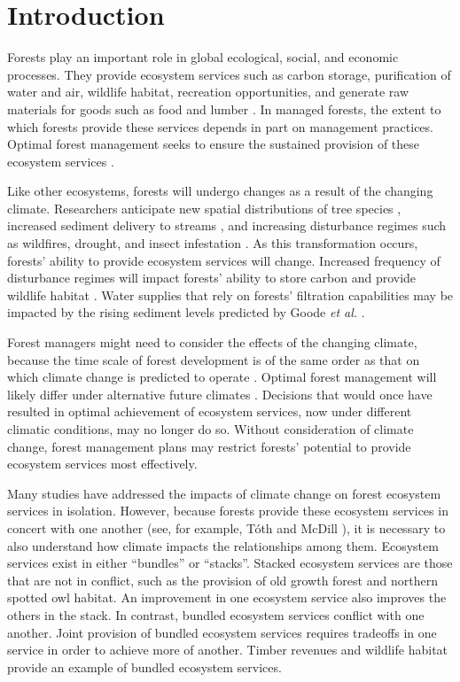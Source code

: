
\section{Introduction}
 
Forests play an important role in global ecological, social, and economic processes. They provide ecosystem services such as carbon storage, purification of water and air, wildlife habitat, recreation opportunities, and generate raw materials for goods such as food and lumber \cite{daily1997ecosystem}. In managed forests, the extent to which forests provide these services depends in part on management practices. Optimal forest management seeks to ensure the sustained provision of these ecosystem services \cite{cfrForestMgmt}.

Like other ecosystems, forests will undergo changes as a result of the changing climate. Researchers anticipate new spatial distributions of tree species \cite{iverson1998predicting}, increased sediment delivery to streams \cite{Goode20121}, and increasing disturbance regimes such as wildfires, drought, and insect infestation \cite{vose2012effects}. As this transformation occurs, forests' ability to provide ecosystem services will change. Increased frequency of disturbance regimes will impact forests' ability to store carbon \cite{bonan2008forests} and provide wildlife habitat \cite{mckenzie2004climatic}. Water supplies that rely on forests' filtration capabilities may be impacted by the rising sediment levels predicted by Goode \textit{et al.} \cite{Goode20121}.

Forest managers might need to consider the effects of the changing climate, because the time scale of forest development is of the same order as that on which climate change is predicted to operate \cite{ipcc2013climate}. Optimal forest management will likely differ under alternative future climates \cite{linder2000developing}. Decisions that would once have resulted in optimal achievement of ecosystem services, now under different climatic conditions, may no longer do so. Without consideration of climate change, forest management plans may restrict forests' potential to provide ecosystem services most effectively.

Many studies have addressed the impacts of climate change on forest ecosystem services in isolation\cite{vose2012effects}\cite{bonan2008forests}\cite{mckenzie2004climatic}. However, because forests provide these ecosystem services in concert with one another (see, for example, T{\'o}th and McDill \cite{toth2009finding}), it is necessary to also understand how climate impacts the relationships among them. Ecosystem services exist in either ``bundles'' or ``stacks''. Stacked ecosystem services are those that are not in conflict, such as the provision of old growth forest and northern spotted owl habitat. An improvement in one ecosystem service also improves the others in the stack. In contrast, bundled ecosystem services conflict with one another. Joint provision of bundled ecosystem services requires tradeoffs in one service in order to achieve more of another. Timber revenues and wildlife habitat provide an example of bundled ecosystem services.

